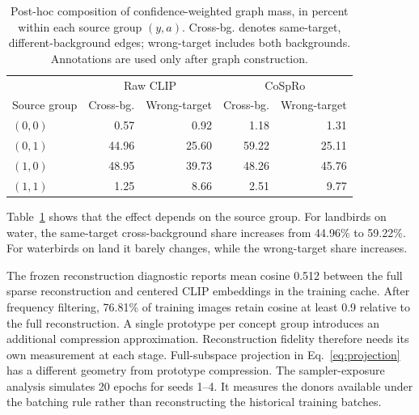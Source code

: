\documentclass{article}
\begin{document}
\begin{table}[htbp]
\centering\small
\caption{Post-hoc composition of confidence-weighted graph mass, in percent
within each source group $(y,a)$. Cross-bg. denotes same-target,
different-background edges; wrong-target includes both backgrounds.
Annotations are used only after graph construction.}
\begin{tabular}{lrrrr}
\toprule
& \multicolumn{2}{c}{Raw CLIP} & \multicolumn{2}{c}{CoSpRo} \\
Source group & Cross-bg. & Wrong-target & Cross-bg. & Wrong-target \\
\midrule
$(0,0)$ & 0.57 & 0.92 & 1.18 & 1.31 \\
$(0,1)$ & 44.96 & 25.60 & 59.22 & 25.11 \\
$(1,0)$ & 48.95 & 39.73 & 48.26 & 45.76 \\
$(1,1)$ & 1.25 & 8.66 & 2.51 & 9.77 \\
\bottomrule
\end{tabular}
\label{tab:graph}
\end{table}

Table~\ref{tab:graph} shows that the effect depends on the source group.
For landbirds on water, the same-target cross-background share increases from
44.96\% to 59.22\%. For waterbirds on land it barely changes, while the
wrong-target share increases.

The frozen reconstruction diagnostic reports mean cosine 0.512 between the
full sparse reconstruction and centered CLIP embeddings in the training cache.
After frequency filtering, 76.81\% of training images retain cosine at least
0.9 relative to the full reconstruction. A single prototype per concept group
introduces an additional compression approximation. Reconstruction fidelity
therefore needs its own measurement at each stage. Full-subspace projection
in Eq.~\ref{eq:projection} has a different geometry from prototype compression.
The sampler-exposure analysis simulates 20 epochs for seeds 1--4. It measures
the donors available under the batching rule rather than reconstructing the
historical training batches.
\end{document}
